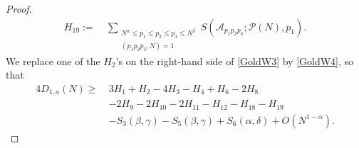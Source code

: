 \documentclass[10pt,a4paper]{amsart}
\def\ge{\geqslant}
\def\le{\leqslant}
\begin{document}
\begin{proof}
\begin{equation}
\begin{split}
H_{19}:=\ &\sum_{\substack{N^\alpha \le p_1 \le p_2 \le p_3\le N^\beta \\ (p_1 p_2 p_3, N) = 1}}  S(\mathscr{A}_{p_1 p_2 p_3}; \mathscr{P}(N), p_1). 
\end{split}
\end{equation}
We replace one of the $H_2$'s on the right-hand side of \eqref{GoldW3} by \eqref{GoldW4}, so that 
 \begin{equation}\label{GoldW5}
\begin{split}
4D_{1,a}(N)\ge\ & 3H_1+H_2-4H_3-H_4+H_6-2H_8\\
& -2H_9-2H_{10}-2H_{11} -H_{12} -H_{18}-H_{19} \\ 
& -S_3(\beta,\gamma)-S_5(\beta,\gamma)+S_6(\alpha,\delta)+O(N^{1-\alpha}). 
\end{split}
\end{equation}


\end{proof}
\end{document}
